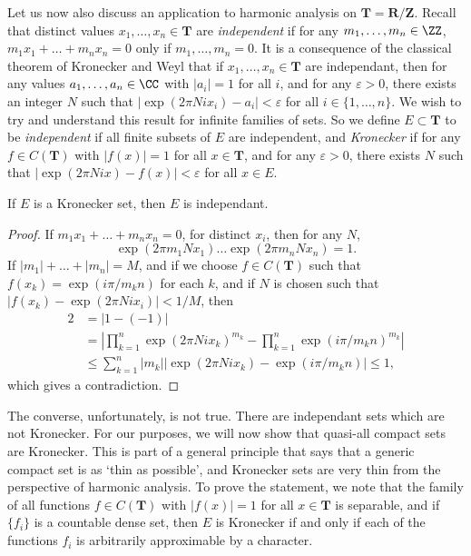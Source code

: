 Let us now also discuss an application to harmonic analysis on $\mathbf{T} = \mathbf{R}/\mathbf{Z}$. Recall that distinct values $x_1, \dots, x_n \in \mathbf{T}$ are \emph{independent} if for any $m_1, \dots, m_n \in \ZZ$, $m_1 x_1 + \dots + m_n x_n = 0$ only if $m_1, \dots, m_n = 0$. It is a consequence of the classical theorem of Kronecker and Weyl that if $x_1, \dots, x_n \in \mathbf{T}$ are independant, then for any values $a_1, \dots, a_n \in \CC$ with $|a_i| = 1$ for all $i$, and for any $\varepsilon > 0$, there exists an integer $N$ such that $|\exp(2 \pi Nix_i) - a_i| < \varepsilon$ for all $i \in \{ 1, \dots, n \}$. We wish to try and understand this result for infinite families of sets. So we define $E \subset \mathbf{T}$ to be \emph{independent} if all finite subsets of $E$ are independent, and \emph{Kronecker} if for any $f \in C(\mathbf{T})$ with $|f(x)| = 1$ for all $x \in \mathbf{T}$, and for any $\varepsilon > 0$, there exists $N$ such that $|\exp(2 \pi Nix) - f(x)| < \varepsilon$ for all $x \in E$.

\begin{lemma}
	If $E$ is a Kronecker set, then $E$ is independant.
\end{lemma}
\begin{proof}
	If $m_1 x_1 + \dots + m_n x_n = 0$, for distinct $x_i$, then for any $N$,
	\[ \exp(2\pi m_1 N x_1) \dots \exp(2\pi m_n N x_n) = 1. \]
	If $|m_1| + \dots + |m_n| = M$, and if we choose $f \in C(\mathbf{T})$ such that $f(x_k) = \exp(i \pi / m_k n)$ for each $k$, and if $N$ is chosen such that $|f(x_k) - \exp(2 \pi N i x_i)| < 1/M$, then
	\begin{align*}
		2 &= |1 - (-1)|\\
		&= \left| \prod_{k = 1}^n \exp(2 \pi N i x_k)^{m_k} - \prod_{k = 1}^n \exp(i \pi / m_k n)^{m_k} \right|\\
		&\leq \sum_{k = 1}^n |m_k| |\exp(2 \pi N i x_k) - \exp(i \pi / m_k n)| \leq 1,
	\end{align*}
	which gives a contradiction.
\end{proof}

The converse, unfortunately, is not true. There are independant sets which are not Kronecker. For our purposes, we will now show that quasi-all compact sets are Kronecker. This is part of a general principle that says that a generic compact set is as `thin as possible', and Kronecker sets are very thin from the perspective of harmonic analysis. To prove the statement, we note that the family of all functions $f \in C(\mathbf{T})$ with $|f(x)| = 1$ for all $x \in \mathbf{T}$ is separable, and if $\{ f_i \}$ is a countable dense set, then $E$ is Kronecker if and only if each of the functions $f_i$ is arbitrarily approximable by a character.

